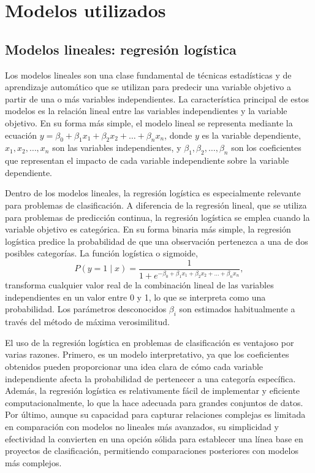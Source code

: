 
\section{Modelos utilizados}
\label{sec:models}

\subsection{Modelos lineales: regresión logística}

Los modelos lineales son una clase fundamental de técnicas estadísticas y de aprendizaje automático que se utilizan para predecir una variable objetivo a partir de una o más variables independientes. La característica principal de estos modelos es la relación lineal entre las variables independientes y la variable objetivo. En su forma más simple, el modelo lineal se representa mediante la ecuación $y = \beta_0 + \beta_1 x_1 + \beta_2 x_2 + \dots + \beta_n x_n$, donde $y$ es la variable dependiente, $x_1, x_2, \dots, x_n$ son las variables independientes, y $\beta_1, \beta_2, \dots, \beta_n$ son los coeficientes que representan el impacto de cada variable independiente sobre la variable dependiente.

Dentro de los modelos lineales, la regresión logística es especialmente relevante para problemas de clasificación. A diferencia de la regresión lineal, que se utiliza para problemas de predicción continua, la regresión logística se emplea cuando la variable objetivo es categórica. En su forma binaria más simple, la regresión logística predice la probabilidad de que una observación pertenezca a una de dos posibles categorías. La función logística o sigmoide, 
\begin{equation*}
    P(y=1\mid x) = \frac{1}{1+e^{-\beta_0 + \beta_1 x_1 + \beta_2 x_2 + \dots + \beta_n x_n}},
\end{equation*}
transforma cualquier valor real de la combinación lineal de las variables independientes en un valor entre 0 y 1, lo que se interpreta como una probabilidad. Los parámetros desconocidos $\beta_i$ son estimados habitualmente a través del método de máxima verosimilitud.

El uso de la regresión logística en problemas de clasificación es ventajoso por varias razones. Primero, es un modelo interpretativo, ya que los coeficientes obtenidos pueden proporcionar una idea clara de cómo cada variable independiente afecta la probabilidad de pertenecer a una categoría específica. Además, la regresión logística es relativamente fácil de implementar y eficiente computacionalmente, lo que la hace adecuada para grandes conjuntos de datos. Por último, aunque su capacidad para capturar relaciones complejas es limitada en comparación con modelos no lineales más avanzados, su simplicidad y efectividad la convierten en una opción sólida para establecer una línea base en proyectos de clasificación, permitiendo comparaciones posteriores con modelos más complejos.


